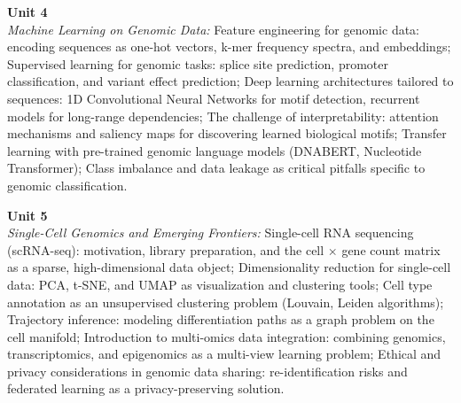 \vspace{0.3cm}

\noindent\textbf{Unit 4} \\
\textit{Machine Learning on Genomic Data:} Feature engineering for genomic data: encoding sequences as one-hot vectors, k-mer frequency spectra, and embeddings; Supervised learning for genomic tasks: splice site prediction, promoter classification, and variant effect prediction; Deep learning architectures tailored to sequences: 1D Convolutional Neural Networks for motif detection, recurrent models for long-range dependencies; The challenge of interpretability: attention mechanisms and saliency maps for discovering learned biological motifs; Transfer learning with pre-trained genomic language models (DNABERT, Nucleotide Transformer); Class imbalance and data leakage as critical pitfalls specific to genomic classification.

\vspace{0.3cm}

\noindent\textbf{Unit 5} \\
\textit{Single-Cell Genomics and Emerging Frontiers:} Single-cell RNA sequencing (scRNA-seq): motivation, library preparation, and the cell $\times$ gene count matrix as a sparse, high-dimensional data object; Dimensionality reduction for single-cell data: PCA, t-SNE, and UMAP as visualization and clustering tools; Cell type annotation as an unsupervised clustering problem (Louvain, Leiden algorithms); Trajectory inference: modeling differentiation paths as a graph problem on the cell manifold; Introduction to multi-omics data integration: combining genomics, transcriptomics, and epigenomics as a multi-view learning problem; Ethical and privacy considerations in genomic data sharing: re-identification risks and federated learning as a privacy-preserving solution.

\newpage
{}